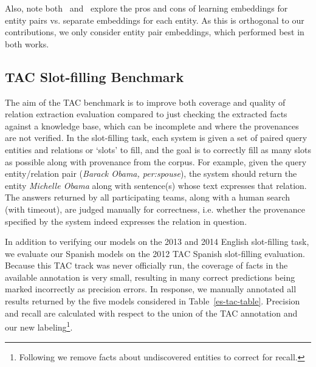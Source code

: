 Also, note both~\citet{toutanova2015representing} and~\citet{limin} explore the pros and cons of learning embeddings for entity pairs vs. separate embeddings for each entity. As this is orthogonal to our contributions, we only consider entity pair embeddings, which performed best in both works.


\subsection{TAC Slot-filling Benchmark}

The aim of the TAC benchmark is to improve both coverage and quality of relation extraction evaluation compared to just checking the extracted facts against a knowledge base, which can be incomplete and where the provenances are not verified. In the slot-filling task, each system is given a set of paired query entities and relations or `slots' to fill, and the goal is to correctly fill as many slots as possible along with provenance from the corpus. For example, given the query entity/relation pair (\emph{Barack Obama, per:spouse}), the system should return the entity \emph{Michelle Obama} along with sentence(s) whose text expresses that relation. The answers returned by all participating teams, along with a human search (with timeout), are judged manually for correctness, i.e. whether the provenance specified by the system indeed expresses the relation in question.


In addition to verifying our models on the 2013 and 2014 English slot-filling task, we evaluate our Spanish models on the 2012 TAC Spanish slot-filling evaluation. Because this TAC track was never officially run, the coverage of facts in the available annotation is very small, resulting in many correct predictions being marked incorrectly as precision errors. In response, we manually annotated all results returned by the five models considered in Table~\ref{es-tac-table}. Precision and recall are calculated with respect to the union of the TAC annotation and our new labeling\footnote{Following \citet{surdeanu2012multi} we remove facts about undiscovered entities to correct for recall.}.


